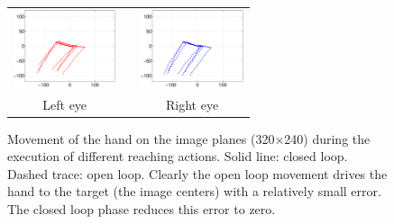 

\begin{figure}[th!]
  \begin{center}
	\begin{tabular}{ccc}
	  \parbox{30mm}{\includegraphics[width=30mm]{Figure/LeftEyeOpenClosedLoop.eps}}  & \hspace{.1cm} &
	  \parbox{30mm}{\includegraphics[width=30mm]{Figure/RightEyeOpenClosedLoop.eps}}
	  \\
	  \parbox{30mm}{\centering Left eye } & \hspace{.1cm} & \parbox{30mm}{\centering Right eye }
  \end{tabular}
\end{center}
\caption{Movement of the hand on the image planes (320$\times$240)
during the execution of different reaching actions. 
Solid line: closed loop. Dashed trace: open loop. Clearly the open loop movement drives the hand to the target (the image centers) with a 
relatively small error. The closed loop phase reduces this error to zero.}\label{Fig:TimeResponseOpenClosedLoopErrors}
  \end{figure}
  
